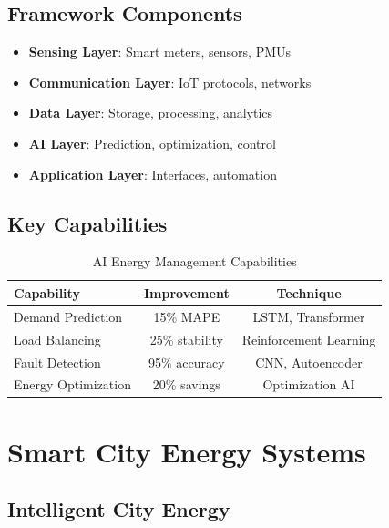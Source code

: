 \documentclass[12pt,a4paper]{article}
\begin{document}
\subsection{Framework Components}

\begin{tcolorbox}[colback=gridblue!10, colframe=gridblue, title=Energy Management Framework]
\begin{itemize}
    \item \textbf{Sensing Layer}: Smart meters, sensors, PMUs
    \item \textbf{Communication Layer}: IoT protocols, networks
    \item \textbf{Data Layer}: Storage, processing, analytics
    \item \textbf{AI Layer}: Prediction, optimization, control
    \item \textbf{Application Layer}: Interfaces, automation
\end{itemize}
\end{tcolorbox}

\subsection{Key Capabilities}

\begin{table}[H]
\centering
\caption{AI Energy Management Capabilities}
\begin{tabular}{lcc}
\toprule
\textbf{Capability} & \textbf{Improvement} & \textbf{Technique} \\
\midrule
Demand Prediction & 15\% MAPE & LSTM, Transformer \\
Load Balancing & 25\% stability & Reinforcement Learning \\
Fault Detection & 95\% accuracy & CNN, Autoencoder \\
Energy Optimization & 20\% savings & Optimization AI \\
\bottomrule
\end{tabular}
\end{table}

\section{Smart City Energy Systems}

\subsection{Intelligent City Energy}
\end{document}

